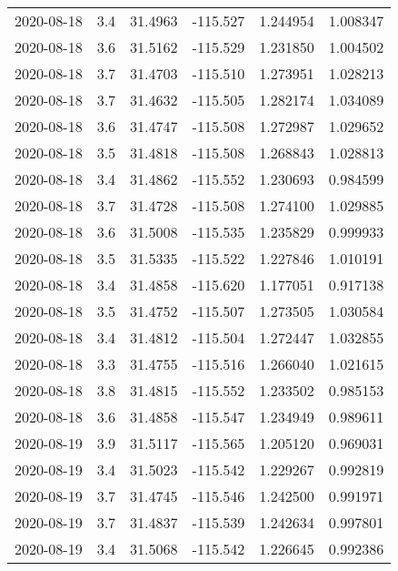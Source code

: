 \begin{tabular}{lrrrrr}
2020-08-18 &       3.4 &  31.4963 &  -115.527 &         1.244954 &         1.008347 \\
2020-08-18 &       3.6 &  31.5162 &  -115.529 &         1.231850 &         1.004502 \\
2020-08-18 &       3.7 &  31.4703 &  -115.510 &         1.273951 &         1.028213 \\
2020-08-18 &       3.7 &  31.4632 &  -115.505 &         1.282174 &         1.034089 \\
2020-08-18 &       3.6 &  31.4747 &  -115.508 &         1.272987 &         1.029652 \\
2020-08-18 &       3.5 &  31.4818 &  -115.508 &         1.268843 &         1.028813 \\
2020-08-18 &       3.4 &  31.4862 &  -115.552 &         1.230693 &         0.984599 \\
2020-08-18 &       3.7 &  31.4728 &  -115.508 &         1.274100 &         1.029885 \\
2020-08-18 &       3.6 &  31.5008 &  -115.535 &         1.235829 &         0.999933 \\
2020-08-18 &       3.5 &  31.5335 &  -115.522 &         1.227846 &         1.010191 \\
2020-08-18 &       3.4 &  31.4858 &  -115.620 &         1.177051 &         0.917138 \\
2020-08-18 &       3.5 &  31.4752 &  -115.507 &         1.273505 &         1.030584 \\
2020-08-18 &       3.4 &  31.4812 &  -115.504 &         1.272447 &         1.032855 \\
2020-08-18 &       3.3 &  31.4755 &  -115.516 &         1.266040 &         1.021615 \\
2020-08-18 &       3.8 &  31.4815 &  -115.552 &         1.233502 &         0.985153 \\
2020-08-18 &       3.6 &  31.4858 &  -115.547 &         1.234949 &         0.989611 \\
2020-08-19 &       3.9 &  31.5117 &  -115.565 &         1.205120 &         0.969031 \\
2020-08-19 &       3.4 &  31.5023 &  -115.542 &         1.229267 &         0.992819 \\
2020-08-19 &       3.7 &  31.4745 &  -115.546 &         1.242500 &         0.991971 \\
2020-08-19 &       3.7 &  31.4837 &  -115.539 &         1.242634 &         0.997801 \\
2020-08-19 &       3.4 &  31.5068 &  -115.542 &         1.226645 &         0.992386 \\

\end{tabular}
